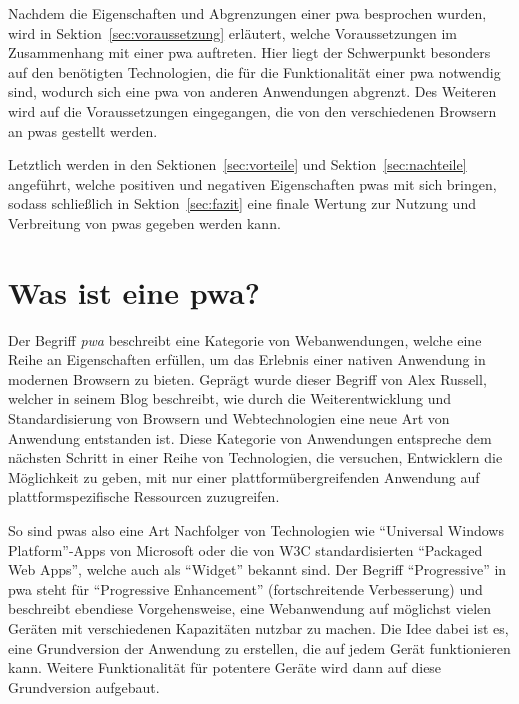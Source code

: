 \documentclass[12pt, parskip=half]{scrartcl}       %
\begin{document}
Nachdem die Eigenschaften und Abgrenzungen einer \ac{pwa} besprochen wurden, wird in Sektion~\ref{sec:voraussetzung} erläutert, welche Voraussetzungen im Zusammenhang mit einer \ac{pwa} auftreten.
Hier liegt der Schwerpunkt besonders auf den benötigten Technologien, die für die Funktionalität einer \ac{pwa} notwendig sind, wodurch sich eine \ac{pwa} von anderen Anwendungen abgrenzt.
Des Weiteren wird auf die Voraussetzungen eingegangen, die von den verschiedenen Browsern an \acp{pwa} gestellt werden.

Letztlich werden in den Sektionen~\ref{sec:vorteile} und Sektion~\ref{sec:nachteile} angeführt, welche positiven und negativen Eigenschaften \acp{pwa} mit sich bringen, sodass schließlich in Sektion~\ref{sec:fazit} eine finale Wertung zur Nutzung und Verbreitung von \acp{pwa} gegeben werden kann.


\newpage

\section{Was ist eine \acl{pwa}?}
\label{sec:wasistpwa}



Der Begriff \textit{\acf{pwa}} beschreibt eine Kategorie von Webanwendungen, welche eine Reihe an Eigenschaften erfüllen, um das Erlebnis einer nativen Anwendung in modernen Browsern zu bieten.
Geprägt wurde dieser Begriff von Alex Russell, welcher in seinem Blog\cite{russell_pwaescapingtabs} beschreibt, wie durch die Weiterentwicklung und Standardisierung von Browsern und Webtechnologien eine neue Art von Anwendung entstanden ist.
Diese Kategorie von Anwendungen entspreche dem nächsten Schritt in einer Reihe von Technologien, die versuchen, Entwicklern die Möglichkeit zu geben, mit nur einer plattformübergreifenden Anwendung auf plattformspezifische Ressourcen zuzugreifen.

So sind \acp{pwa} also eine Art Nachfolger von Technologien wie \enquote{Universal Windows Platform}-Apps\cite{msdocs_uwp} von Microsoft oder die von W3C standardisierten \enquote{Packaged Web Apps}\cite{w3c_packagedwebapps}, welche auch als \enquote{Widget} bekannt sind.
Der Begriff \enquote{Progressive} in \acl{pwa} steht für \enquote{Progressive Enhancement} (fortschreitende Verbesserung) und beschreibt ebendiese Vorgehensweise, eine Webanwendung auf möglichst vielen Geräten mit verschiedenen Kapazitäten nutzbar zu machen.
Die Idee dabei ist es, eine Grundversion der Anwendung zu erstellen, die auf jedem Gerät funktionieren kann.
Weitere Funktionalität für potentere Geräte wird dann auf diese Grundversion aufgebaut.
\end{document}
